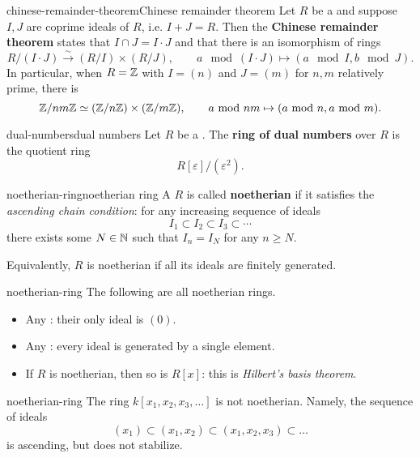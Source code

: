 \begin{topic}{chinese-remainder-theorem}{Chinese remainder theorem}
    Let $R$ be a  and suppose $I, J$ are coprime ideals of $R$, i.e. $I + J = R$. Then the \textbf{Chinese remainder theorem} states that $I \cap J = I \cdot J$ and that there is an isomorphism of rings
    \[ R / (I \cdot J) \xrightarrow{\sim} (R / I) \times (R/J), \qquad a \mod (I \cdot J) \mapsto (a \mod I, b \mod J) . \]
    In particular, when $R = \mathbb{Z}$ with $I = (n)$ and $J = (m)$ for $n, m$ relatively prime, there is
    \[ \mathbb{Z} / nm \mathbb{Z} \simeq (\mathbb{Z}/n\mathbb{Z}) \times (\mathbb{Z}/m\mathbb{Z}), \qquad a \textup{ mod } nm \mapsto (a \textup{ mod } n, a \textup{ mod } m) . \]
\end{topic}

\begin{topic}{dual-numbers}{dual numbers}
    Let $R$ be a . The \textbf{ring of dual numbers} over $R$ is the quotient ring
    \[ R[\varepsilon] / (\varepsilon^2) . \]
\end{topic}

\begin{topic}{noetherian-ring}{noetherian ring}
    A  $R$ is called \textbf{noetherian} if it satisfies the \textit{ascending chain condition}: for any increasing sequence of ideals
    \[ I_1 \subset I_2 \subset I_3 \subset \cdots \]
    there exists some $N \in \mathbb{N}$ such that $I_n = I_N$ for any $n \ge N$.
    
    Equivalently, $R$ is noetherian if all its ideals are finitely generated.
\end{topic}

\begin{example}{noetherian-ring}
    The following are all noetherian rings.
    \begin{itemize}
        \item Any : their only ideal is $(0)$.
        \item Any : every ideal is generated by a single element.
        \item If $R$ is noetherian, then so is $R[x]$: this is \textit{Hilbert's basis theorem}.
    \end{itemize}
\end{example}

\begin{example}{noetherian-ring}
    The ring $k[x_1, x_2, x_3, \ldots]$ is not noetherian. Namely, the sequence of ideals
    \[ (x_1) \subset (x_1, x_2) \subset (x_1, x_2, x_3) \subset \ldots \]
    is ascending, but does not stabilize.
\end{example}

